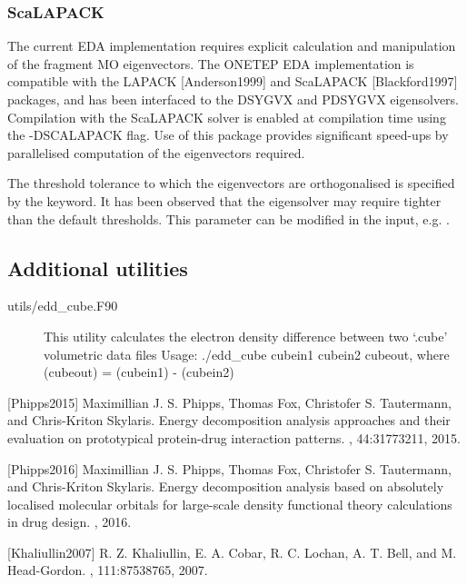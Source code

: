 \documentclass[letterpaper,10pt,english]{sphinxmanual}
\begin{document}
\subsubsection{ScaLAPACK}
\label{\detokenize{EDA:scalapack}}
The current EDA implementation requires explicit calculation and
manipulation of the fragment MO eigenvectors. The ONETEP EDA
implementation is compatible with the LAPACK {[}Anderson1999{]}
and ScaLAPACK {[}Blackford1997{]} packages, and has been
interfaced to the DSYGVX and PDSYGVX eigensolvers. Compilation with the
ScaLAPACK solver is enabled at compilation time using the -DSCALAPACK
flag. Use of this package provides significant speed-ups by parallelised
computation of the eigenvectors required.

The threshold tolerance to which the eigenvectors are orthogonalised is
specified by the  keyword. It has been observed
that the eigensolver may require tighter than the default thresholds.
This parameter can be modified in the input, e.g.
.


\subsection{Additional utilities}
\label{\detokenize{EDA:additional-utilities}}\begin{description}
\item[{utils/edd\_cube.F90}] \leavevmode
This utility calculates the electron density difference between two
‘.cube’ volumetric data files Usage: ./edd\_cube cubein1 cubein2
cubeout, where (cubeout) = (cubein1) - (cubein2)

\end{description}

{[}Phipps2015{]} Maximillian J. S. Phipps, Thomas Fox, Christofer S. Tautermann, and Chris-Kriton Skylaris. Energy decomposition analysis approaches and their evaluation on prototypical protein-drug interaction patterns. , 44:3177\textendash{}3211, 2015.

{[}Phipps2016{]} Maximillian J. S. Phipps, Thomas Fox, Christofer S. Tautermann, and Chris-Kriton Skylaris. Energy decomposition analysis based on absolutely localised molecular orbitals for large-scale density functional theory calculations in drug design. , 2016.

{[}Khaliullin2007{]} R. Z. Khaliullin, E. A. Cobar, R. C. Lochan, A. T. Bell, and M. Head-Gordon. , 111:8753\textendash{}8765, 2007.
\end{document}
